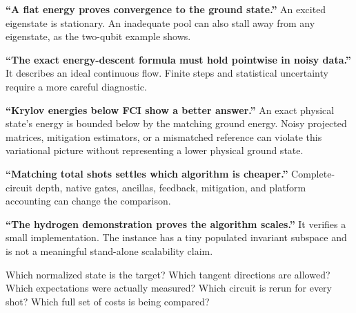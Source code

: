 \documentclass[11pt,a4paper]{article}
\begin{document}
\textbf{``A flat energy proves convergence to the ground state.''} An excited eigenstate is stationary. An inadequate pool can also stall away from any eigenstate, as the two-qubit example shows.

\textbf{``The exact energy-descent formula must hold pointwise in noisy data.''} It describes an ideal continuous flow. Finite steps and statistical uncertainty require a more careful diagnostic.

\textbf{``Krylov energies below FCI show a better answer.''} An exact physical state's energy is bounded below by the matching ground energy. Noisy projected matrices, mitigation estimators, or a mismatched reference can violate this variational picture without representing a lower physical ground state.

\textbf{``Matching total shots settles which algorithm is cheaper.''} Complete-circuit depth, native gates, ancillas, feedback, mitigation, and platform accounting can change the comparison.

\textbf{``The hydrogen demonstration proves the algorithm scales.''} It verifies a small implementation. The instance has a tiny populated invariant subspace and is not a meaningful stand-alone scalability claim.

\begin{idea}
Which normalized state is the target? Which tangent directions are allowed? Which expectations were actually measured? Which circuit is rerun for every shot? Which full set of costs is being compared?
\end{idea}
\end{document}
